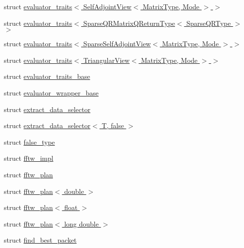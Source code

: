 \begin{DoxyCompactItemize}
\item 
struct \hyperlink{struct_eigen_1_1internal_1_1evaluator__traits_3_01_self_adjoint_view_3_01_matrix_type_00_01_mode_01_4_01_4}{evaluator\+\_\+traits$<$ Self\+Adjoint\+View$<$ Matrix\+Type, Mode $>$ $>$}
\item 
struct \hyperlink{struct_eigen_1_1internal_1_1evaluator__traits_3_01_sparse_q_r_matrix_q_return_type_3_01_sparse_q_r_type_01_4_01_4}{evaluator\+\_\+traits$<$ Sparse\+Q\+R\+Matrix\+Q\+Return\+Type$<$ Sparse\+Q\+R\+Type $>$ $>$}
\item 
struct \hyperlink{struct_eigen_1_1internal_1_1evaluator__traits_3_01_sparse_self_adjoint_view_3_01_matrix_type_00_01_mode_01_4_01_4}{evaluator\+\_\+traits$<$ Sparse\+Self\+Adjoint\+View$<$ Matrix\+Type, Mode $>$ $>$}
\item 
struct \hyperlink{struct_eigen_1_1internal_1_1evaluator__traits_3_01_triangular_view_3_01_matrix_type_00_01_mode_01_4_01_4}{evaluator\+\_\+traits$<$ Triangular\+View$<$ Matrix\+Type, Mode $>$ $>$}
\item 
struct \hyperlink{struct_eigen_1_1internal_1_1evaluator__traits__base}{evaluator\+\_\+traits\+\_\+base}
\item 
struct \hyperlink{struct_eigen_1_1internal_1_1evaluator__wrapper__base}{evaluator\+\_\+wrapper\+\_\+base}
\item 
struct \hyperlink{struct_eigen_1_1internal_1_1extract__data__selector}{extract\+\_\+data\+\_\+selector}
\item 
struct \hyperlink{struct_eigen_1_1internal_1_1extract__data__selector_3_01_t_00_01false_01_4}{extract\+\_\+data\+\_\+selector$<$ T, false $>$}
\item 
struct \hyperlink{struct_eigen_1_1internal_1_1false__type}{false\+\_\+type}
\item 
struct \hyperlink{struct_eigen_1_1internal_1_1fftw__impl}{fftw\+\_\+impl}
\item 
struct \hyperlink{struct_eigen_1_1internal_1_1fftw__plan}{fftw\+\_\+plan}
\item 
struct \hyperlink{struct_eigen_1_1internal_1_1fftw__plan_3_01double_01_4}{fftw\+\_\+plan$<$ double $>$}
\item 
struct \hyperlink{struct_eigen_1_1internal_1_1fftw__plan_3_01float_01_4}{fftw\+\_\+plan$<$ float $>$}
\item 
struct \hyperlink{struct_eigen_1_1internal_1_1fftw__plan_3_01long_01double_01_4}{fftw\+\_\+plan$<$ long double $>$}
\item 
struct \hyperlink{struct_eigen_1_1internal_1_1find__best__packet}{find\+\_\+best\+\_\+packet}

\end{DoxyCompactItemize}
